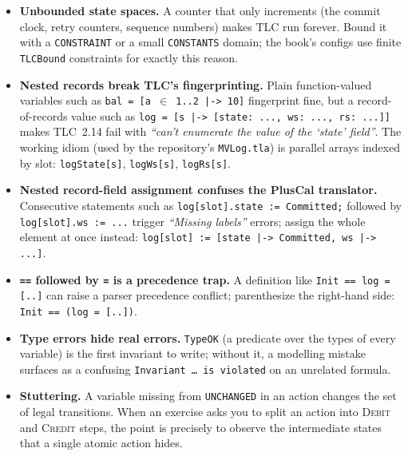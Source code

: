 \begin{itemize}
    \item \textbf{Unbounded state spaces.}  A counter that only increments
          (the commit clock, retry counters, sequence numbers) makes TLC run
          forever.  Bound it with a \texttt{CONSTRAINT} or a small
          \texttt{CONSTANTS} domain; the book's configs use finite
          \texttt{TLCBound} constraints for exactly this reason.
    \item \textbf{Nested records break TLC's fingerprinting.}  Plain
          function-valued variables such as
          \texttt{bal = [a $\in$ 1..2 |-> 10]} fingerprint fine, but a
          record-of-records value such as
          \texttt{log = [s |-> [state: ..., ws: ..., rs: ...]]} makes
          TLC~2.14 fail with \emph{``can't enumerate the value of the
          `state' field''}.  The working idiom (used by the repository's
          \texttt{MVLog.tla}) is parallel arrays indexed by slot:
          \texttt{logState[s]}, \texttt{logWs[s]}, \texttt{logRs[s]}.
    \item \textbf{Nested record-field assignment confuses the PlusCal
          translator.}  Consecutive statements such as
          \texttt{log[slot].state := Committed;} followed by
          \texttt{log[slot].ws := ...} trigger \emph{``Missing labels''}
          errors; assign the whole element at once instead:
          \texttt{log[slot] := [state |-> Committed, ws |-> ...]}.
    \item \textbf{\texttt{==} followed by \texttt{=} is a precedence
          trap.}  A definition like \texttt{Init == log = [..]} can raise a
          parser precedence conflict; parenthesize the right-hand side:
          \texttt{Init == (log = [..])}.
    \item \textbf{Type errors hide real errors.}  \texttt{TypeOK} (a
          predicate over the types of every variable) is the first
          invariant to write; without it, a modelling mistake surfaces as a
          confusing \texttt{Invariant \ldots\ is violated} on an unrelated
          formula.
    \item \textbf{Stuttering.}  A variable missing from \texttt{UNCHANGED}
          in an action changes the set of legal transitions.  When an
          exercise asks you to split an action into \textsc{Debit} and
          \textsc{Credit} steps, the point is precisely to observe the
          intermediate states that a single atomic action hides.
\end{itemize}

